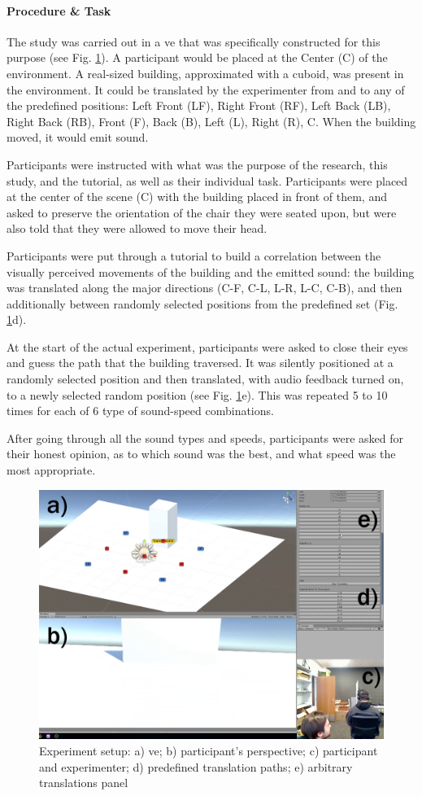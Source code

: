 \paragraph{Procedure \& Task}
The study was carried out in a \gls{ve} that was specifically constructed for this purpose (see Fig. \ref{fig:clipimage001}). A participant would be placed at the Center (C) of the environment. A real-sized building, approximated with a cuboid, was present in the environment. It could be translated by the experimenter from and to any of the predefined positions: Left Front (LF), Right Front (RF), Left Back (LB), Right Back (RB), Front (F), Back (B), Left (L), Right (R), C. When the building moved, it would emit sound.

Participants were instructed with what was the purpose of the research, this study, and the tutorial, as well as their individual task. Participants were placed at the center of the scene (C) with the building placed in front of them, and asked to preserve the orientation of the chair they were seated upon, but were also told that they were allowed to move their head.

Participants were put through a tutorial to build a correlation between the visually perceived movements of the building and the emitted sound: the building was translated along the major directions (C-F, C-L, L-R, L-C, C-B), and then additionally between randomly selected positions from the predefined set (Fig. \ref{fig:clipimage001}d).

At the start of the actual experiment, participants were asked to close their eyes and guess the path that the building traversed. It was silently positioned at a randomly selected position and then translated, with audio feedback turned on, to a newly selected random position (see Fig. \ref{fig:clipimage001}e). This was repeated 5 to 10 times for each of 6 type of sound-speed combinations.

After going through all the sound types and speeds, participants were asked for their honest opinion, as to which sound was the best, and what speed was the most appropriate.

\begin{figure}
	\centering
	\includegraphics[width=.8\linewidth]{figures/pilot1_experiment_setup.png}
	\caption{Experiment setup: a) \gls{ve}; b) participant's perspective; c) participant and experimenter; d) predefined translation paths; e) arbitrary translations panel}
	\label{fig:clipimage001}
\end{figure}

